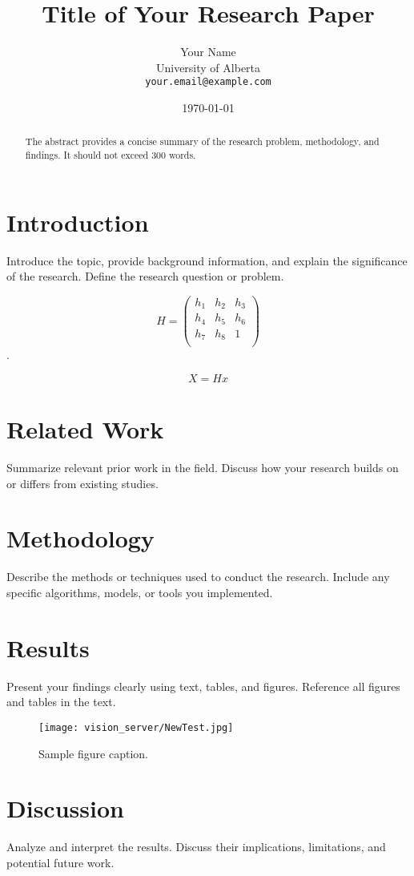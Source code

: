 \documentclass[11pt]{article}
\title{Title of Your Research Paper}
\author{Your Name \\
University of Alberta \\
\texttt{your.email@example.com}}
\date{\today}
\begin{document}
\maketitle

\begin{abstract}
The abstract provides a concise summary of the research problem, methodology, and findings. It should not exceed 300 words.
\end{abstract}

\section{Introduction}
Introduce the topic, provide background information, and explain the significance of the research. Define the research question or problem.

$$ H =
\begin{pmatrix}
h_1 & h_2 & h_3 \\
h_4 & h_5 & h_6 \\
h_7 & h_8 & 1 \\
\end{pmatrix}
$$.

$$
X = Hx
$$

\section{Related Work}
Summarize relevant prior work in the field. Discuss how your research builds on or differs from existing studies.

\section{Methodology}
Describe the methods or techniques used to conduct the research. Include any specific algorithms, models, or tools you implemented.

\section{Results}
Present your findings clearly using text, tables, and figures. Reference all figures and tables in the text.

\begin{figure}[h!]
\centering
\texttt{[image: vision\_server/NewTest.jpg]} %
\caption{Sample figure caption.}
\label{fig:example}
\end{figure}

\section{Discussion}
Analyze and interpret the results. Discuss their implications, limitations, and potential future work.
\end{document}

